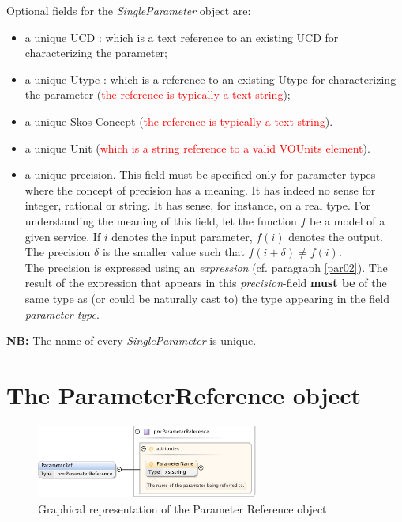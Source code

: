 \documentclass[a4paper,11pt] {ivoa}
\begin{document}
Optional fields for the {\it SingleParameter} object are:
\begin{itemize}
\item a unique UCD : which is a text reference to an existing UCD for characterizing the parameter;
\item a unique Utype  : which is a reference to an existing Utype for characterizing the parameter
(\textcolor{red}{the reference is typically a text string});
\item a unique Skos Concept  (\textcolor{red}{the reference is typically a text string}).
\item a unique Unit (\textcolor{red}{which is a string reference to a valid VOUnits element}).
\item a unique precision. This field must be specified only for parameter types where the concept of
precision has a meaning. It has indeed no sense for integer, rational or string. It has
sense, for instance, on a real type. For understanding the meaning of this field, let the function
$f$ be a model of a given service. If $i$ denotes the input parameter, $f(i)$ denotes the output. The
precision $\delta$ is the smaller value such that $f(i+\delta) \neq f(i)$.\\ The precision is
expressed using an {\it expression} (cf. paragraph \ref{par02}). The result of the expression that
appears in this {\it precision}-field  {\bf must be} of the same type as (or could be naturally
cast to) the type appearing in the field {\it parameter type}.
\end{itemize}

{\bf NB:} The name of every {\it SingleParameter} is unique. 

\section{The ParameterReference object}\label{par-parRef}

\begin{figure}[htbp]
\begin{center}
\includegraphics[width=0.65\textwidth]{pictures/ParameterRef.jpg} 
\caption{Graphical representation of the Parameter Reference object}
\label{Pic-ParameterRef}
\end{center}
\end{figure}
\end{document}
